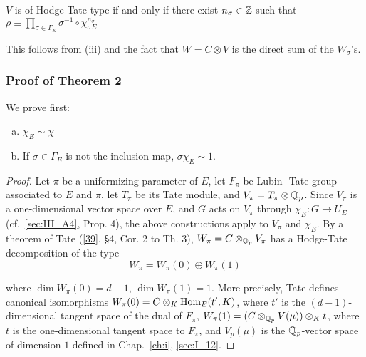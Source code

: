 \begin{subappendices}

\dpage

\begin{cor}
$V$ is of Hodge-Tate type if and only if there exist $n_\sigma \in \mathbb{Z}$ such that
$\rho \equiv \prod_{\sigma \in \Gamma_E} \sigma^{-1} \circ \chi_{\sigma
E}^{n_\sigma}$
\end{cor}

This follows from (iii) and the fact that $W = C \otimes V$ is the direct sum of
the $W_\sigma$'s.

\subsubsection{Proof of Theorem 2}

We prove first:

\begin{lem}\label{lem:III_A5_2}
\begin{enumerate}[(a)]
	\item $\chi_E \sim \chi$
	\item If $\sigma \in \Gamma_E$ is not the inclusion map, $\sigma \chi_E
\sim 1$.
\end{enumerate}
\end{lem}

\begin{proof}
Let $\pi$ be a uniformizing parameter of $E$, let $F_\pi$ be Lubin- Tate group
associated to $E$ and $\pi$, let $T_\pi$ be its Tate module, and $V_\pi = T_\pi
\otimes \mathbb{Q}_p$. Since $V_\pi$ is a one-dimensional vector space over $E$, and $G$
acts on $V_\pi$ through $\chi_E \colon G \to U_E$ (cf.\ \ref{sec:III_A4}, Prop.
4), the above constructions apply to $V_\pi$ and $\chi_E$. By a theorem of Tate
(\ref{39}, \S4, Cor. 2 to Th. 3), $W_\pi = C \otimes_{\mathbb{Q}_p} V_\pi$ has a
Hodge-Tate decomposition of the type
\[
	W_\pi = W_\pi(0) \oplus W_\pi(1)
\]

where $\dim W_\pi(0) = d - 1$, $\dim W_\pi (1) = 1$. More precisely, Tate
defines canonical isomorphisms $W_\pi(0) = C \otimes_K \operatorname{Hom}_E(t',K)$, where $t'$ 
\dpage 
is the $(d-1)$-dimensional tangent space of the dual of $F_\pi$, $W_\pi(1) = (C
\otimes_{\mathbb{Q}_p} V(\mu)) \otimes_K t$, where $t$ is the one-dimensional
tangent space to $F_\pi$, and $V_p(\mu)$ is the $\mathbb{Q}_p$-vector space of dimension
$1$ defined in Chap.~\ref{ch:i}, \ref{sec:I_12}.


\end{proof}
\end{subappendices}
